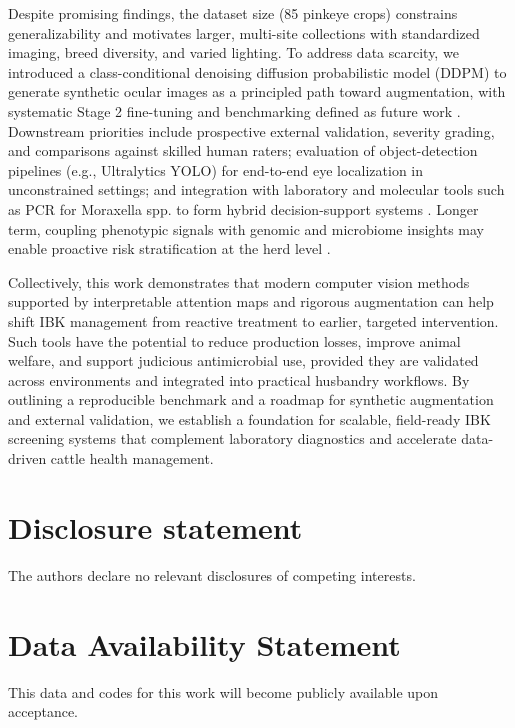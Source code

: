 \documentclass[preprint,12pt,authoryear]{elsarticle}
\begin{document}
Despite promising findings, the dataset size (85 pinkeye crops) constrains generalizability and motivates larger, multi-site collections with standardized imaging, breed diversity, and varied lighting. To address data scarcity, we introduced a class-conditional denoising diffusion probabilistic model (DDPM) to generate synthetic ocular images as a principled path toward augmentation, with systematic Stage 2 fine-tuning and benchmarking defined as future work \citep{ho2020ddpm}. Downstream priorities include prospective external validation, severity grading, and comparisons against skilled human raters; evaluation of object-detection pipelines (e.g., Ultralytics YOLO) for end-to-end eye localization in unconstrained settings; and integration with laboratory and molecular tools such as PCR for Moraxella spp. to form hybrid decision-support systems \citep{angelos2007, angelos2015}. Longer term, coupling phenotypic signals with genomic and microbiome insights may enable proactive risk stratification at the herd level \citep{kizilkaya2013, holman2017, gupta2023}.

Collectively, this work demonstrates that modern computer vision methods supported by interpretable attention maps and rigorous augmentation can help shift IBK management from reactive treatment to earlier, targeted intervention. Such tools have the potential to reduce production losses, improve animal welfare, and support judicious antimicrobial use, provided they are validated across environments and integrated into practical husbandry workflows. By outlining a reproducible benchmark and a roadmap for synthetic augmentation and external validation, we establish a foundation for scalable, field-ready IBK screening systems that complement laboratory diagnostics and accelerate data-driven cattle health management.

\section{Disclosure statement}
\label{disclosure-statement}

The authors declare no relevant disclosures of competing interests.



\section{Data Availability Statement}
\label{data-availability-statement}

This data and codes for this work will become publicly available upon acceptance.

 
  
 
\end{document}

